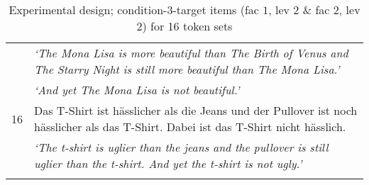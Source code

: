 \documentclass[output=paper,
modfonts
]{langscibook}
\begin{document}
\begin{table}[H]
\begin{tabular}{l|l}
   & \textit{`The Mona Lisa is more beautiful than The Birth of Venus and The Starry Night is still more beautiful than The Mona Lisa.'}\\
   & \textit{`And yet The Mona Lisa is not beautiful.'}\\
\midrule
16 & Das T-Shirt ist hässlicher als die Jeans und der Pullover ist noch hässlicher als das T-Shirt. Dabei ist das T-Shirt nicht hässlich.\\
   & \textit{`The t-shirt is uglier than the jeans and the pullover is still uglier than the t-shirt. And yet the t-shirt is not ugly.'}\\
\lspbottomrule
\end{tabular}
\caption{Experimental design; condition-3-target items (fac $1$, lev $2$ \& fac $2$, lev $2$) for 16 token sets}
\label{tab:16_contexts}
\end{table}
\end{document}
